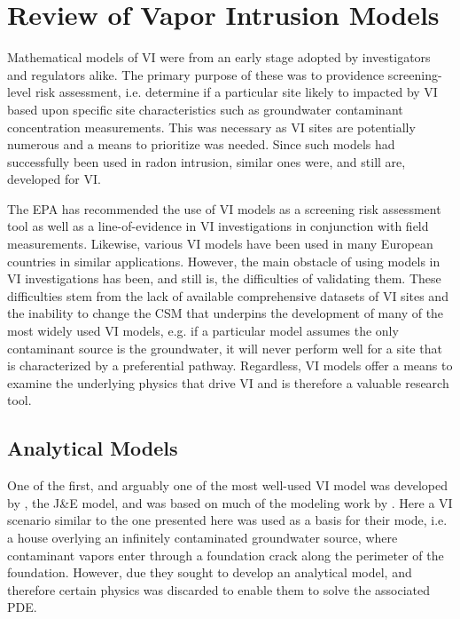 \section{Review of Vapor Intrusion Models}\label{sec:model_review}

Mathematical models of VI were from an early stage adopted by investigators and regulators alike.
The primary purpose of these was to providence screening-level risk assessment, i.e. determine if a particular site likely to impacted by VI based upon specific site characteristics such as groundwater contaminant concentration measurements.
This was necessary as VI sites are potentially numerous and a means to prioritize was needed.
Since such models had successfully been used in radon intrusion, similar ones were, and still are, developed for VI\cite{u.s._environmental_protection_agency_oswer_2015}.\par

The EPA has recommended the use of VI models as a screening risk assessment tool as well as a line-of-evidence in VI investigations in conjunction with field measurements\cite{u.s._environmental_protection_agency_oswer_2015}.
Likewise, various VI models have been used in many European countries in similar applications\cite{provoost_accuracy_2009}.
However, the main obstacle of using models in VI investigations has been, and still is, the difficulties of validating them.
These difficulties stem from the lack of available comprehensive datasets of VI sites and the inability to change the CSM that underpins the development of many of the most widely used VI models, e.g. if a particular model assumes the only contaminant source is the groundwater, it will never perform well for a site that is characterized by a preferential pathway.
Regardless, VI models offer a means to examine the underlying physics that drive VI and is therefore a valuable research tool.\par

\subsection{Analytical Models}

One of the first, and arguably one of the most well-used VI model was developed by \citeauthor{johnson_heuristic_1991}\cite{johnson_heuristic_1991}, the J\&E model, and was based on much of the modeling work by \citeauthor{nazaroff_predicting_1988}\cite{nazaroff_predicting_1988}.
Here a VI scenario similar to the one presented here was used as a basis for their mode, i.e. a house overlying an infinitely contaminated groundwater source, where contaminant vapors enter through a foundation crack along the perimeter of the foundation.
However, due they sought to develop an analytical model, and therefore certain physics was discarded to enable them to solve the associated PDE.\par


